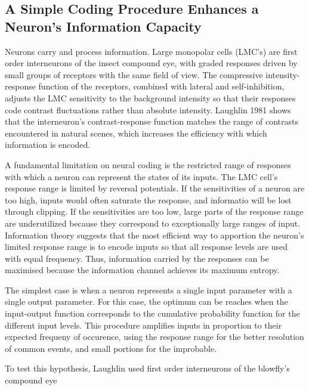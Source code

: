 \documentclass[twoside]{article}
\begin{document}
\begin{multicols}{2}
\section{A Simple Coding Procedure Enhances a Neuron's Information Capacity}

Neurons carry and process information. Large monopolar cells (LMC's) are first order interneurons of the insect compound eye, with graded responses driven by small groups of receptors with the same field of view. The compressive intensity-response function of the receptors, combined with lateral and self-inhibition, adjusts the LMC sensitivity to the background intensity so that their responses code contrast fluctuations rather than absolute intensity. Laughlin 1981 shows that the interneuron's contrast-response function matches the range of contrasts encountered in natural scenes, which increases the efficiency with which information is encoded. 

A fundamental limitation on neural coding is the restricted range of responses with which a neuron can represent the states of its inputs. The LMC cell's response range is limited by reversal potentials. If the sensitivities of a neuron are too high, inputs would often saturate the response, and informatio will be lost through clipping. If the sensitivities are too low, large parts of the response range are underutilized because they correspond to exceptionally large ranges of input. Information theory suggests that the most efficient way to apportion the neuron's limited response range is to encode inputs so that all response levels are used with equal frequency. Thus, information carried by the responses can be maximised because the information channel achieves its maximum entropy. 

The simplest case is when a neuron represents a single input parameter with a single output parameter. For this case, the optimum can be reaches when the input-output function corresponds to the cumulative probability function for the different input levels. This procedure amplifies inputs in proportion to their expected frequeny of occurence, using the response range for the better resolution of common events, and small portions for the improbable. 

To test this hypothesis, Laughlin used first order interneurons of the blowfly's compound eye 


\end{multicols}
\end{document}
